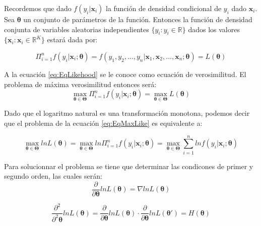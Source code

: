 \documentclass[
]{book}
\begin{document}
Recordemos que dado \(f(y_i | \mathbf{x}_i)\) la función de densidad condicional de \(y_i\) dado \(\mathbf{x}_i\). Sea \(\boldsymbol{\theta}\) un conjunto de parámetros de la función. Entonces la función de densidad conjunta de variables aleatorias independientes \(\{ y_i : y_i \in \mathbb{R} \}\) dados los valores \(\{ \mathbf{x}_i : \mathbf{x}_i \in \mathbb{R}^K \}\) estará dada por:

\begin{equation}
    \Pi_{i = 1}^{n} f(y_i | \mathbf{x}_i; \boldsymbol{\theta}) = f(y_1, y_2, \ldots, y_n | \mathbf{x}_1, \mathbf{x}_2, \ldots, \mathbf{x}_n; \boldsymbol{\theta}) = L(\boldsymbol{\theta})
    \label{eq:EqLikehood}
\end{equation}

A la ecuación \eqref{eq:EqLikehood} se le conoce como ecuación de verosimilitud. El problema de máxima verosimilitud entonces será:
\begin{equation}
    \max_{\boldsymbol{\theta} \in \boldsymbol{\Theta}} \Pi_{i = 1}^{n} f(y_i | \mathbf{x}_i; \boldsymbol{\theta}) = \max_{\boldsymbol{\theta} \in \boldsymbol{\Theta}} L(\boldsymbol{\theta})
        \label{eq:EqMaxLike}
\end{equation}

Dado que el logaritmo natural es una transformación monotona, podemos decir que el problema de la ecuación \eqref{eq:EqMaxLike} es equivalente a:

\begin{equation}
     \max_{\boldsymbol{\theta} \in \boldsymbol{\Theta}} ln L(\boldsymbol{\theta}) = \max_{\boldsymbol{\theta} \in \boldsymbol{\Theta}} ln \Pi_{i = 1}^{n} f(y_i | \mathbf{x}_i; \boldsymbol{\theta}) = \max_{\boldsymbol{\theta} \in \boldsymbol{\Theta}} \sum_{i = 1}^{n} ln f(y_i | \mathbf{x}_i; \boldsymbol{\theta})
            \label{eq:EqLogML}
\end{equation}

Para solucionnar el problema se tiene que determinar las condicones de primer y segundo orden, las cuales serán:
\begin{equation}
    \frac{\partial}{\partial \boldsymbol{\theta}} ln L(\boldsymbol{\theta}) = \nabla ln L(\boldsymbol{\theta})
          \label{eq:MLCPO}
\end{equation}

\begin{equation}
    \frac{\partial^2}{\partial^2 \boldsymbol{\theta}} ln L(\boldsymbol{\theta}) = \frac{\partial}{\partial \boldsymbol{\theta}} ln L(\boldsymbol{\theta}) \cdot  \frac{\partial}{\partial \boldsymbol{\theta}} ln L(\boldsymbol{\theta}') = H(\boldsymbol{\theta})
             \label{eq:MLCSO}
\end{equation}
\end{document}
